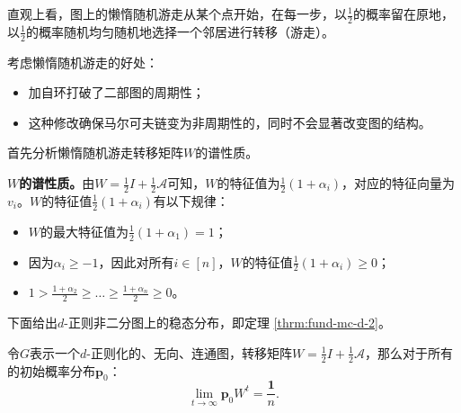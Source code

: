 直观上看，图上的懒惰随机游走从某个点开始，在每一步，以$\frac{1}{2}$的概率留在原地，以$\frac{1}{2}$的概率随机均匀随机地选择一个邻居进行转移（游走）。

考虑懒惰随机游走的好处：
\begin{itemize}
    \item 加自环打破了二部图的周期性；
    \item 这种修改确保马尔可夫链变为非周期性的，同时不会显著改变图的结构。
\end{itemize}

首先分析懒惰随机游走转移矩阵$W$的谱性质。
            
\vspace{0.2cm}
\textbf{$W$的谱性质。}由$W=\frac{1}{2}I+\frac{1}{2}\mathcal{A}$可知，$W$的特征值为$\frac{1}{2}(1+\alpha_i)$，对应的特征向量为$v_i$。$W$的特征值$\frac{1}{2}(1+\alpha_i)$有以下规律：
\begin{itemize}
    \item $W$的最大特征值为$\frac{1}{2}(1+\alpha_1)=1$；
    \item 因为$\alpha_i\ge -1$，因此对所有$i\in[n]$，$W$的特征值$\frac{1}{2}(1+\alpha_i)\ge 0$；
    \item $1> \frac{1+\alpha_2}{2}\ge \dots\ge \frac{1+\alpha_n}{2}\ge 0$。
\end{itemize}
            
下面给出$d$-正则非二分图上的稳态分布，即定理 \ref{thrm:fund-mc-d-2}。

\begin{theorem}
    \label{thrm:fund-mc-d-2}
    令$G$表示一个$d$-正则化的、无向、连通图，转移矩阵$W=\frac{1}{2}I+\frac{1}{2}\mathcal{A}$，那么对于所有的初始概率分布$\bm{p}_0$：
    \[
        \lim_{t \to \infty} \bm{p}_0W^t  = \frac{\bm{1}}{n}.
    \]
\end{theorem}

